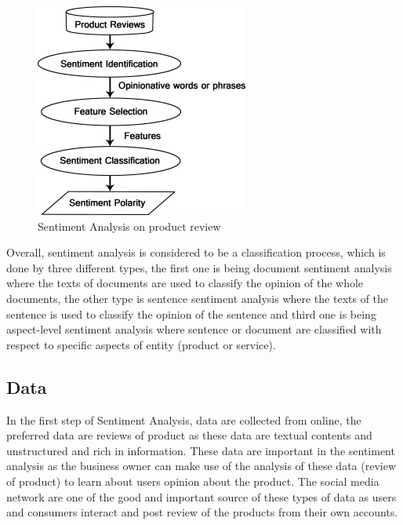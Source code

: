 \documentclass[sigconf]{acmart}
\begin{document}
\begin{figure}[!ht]
  \centering\includegraphics[width=\columnwidth]{images/sa.jpg}
  \caption{Sentiment Analysis on product review \cite{sentianalysis}}\label{f:SA}
\end{figure}

Overall, sentiment analysis is considered to be a classification process, which is done by three different types, the first one is being document sentiment analysis where the texts of documents are used to classify the opinion of the whole documents, the other type is sentence sentiment analysis where the texts of the sentence is used to classify the opinion of the sentence and third one is being aspect-level sentiment analysis where sentence or document are classified with respect to specific aspects of entity (product or service). 
\subsection{Data}
In the first step of Sentiment Analysis, data are collected from online, the preferred data are reviews of product as these data are textual contents and unstructured and rich in information. These data are important in the sentiment analysis as the business owner can make use of the analysis of these data (review of product) to learn about users opinion about the product. The social media network are one of the good and important source of these types of data as users and consumers interact and post review of the products from their own accounts. 
\end{document}
